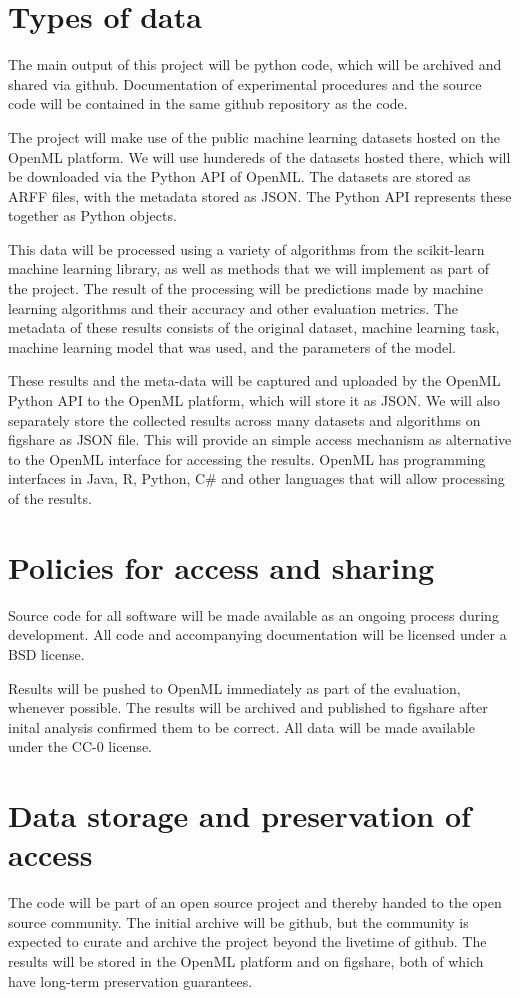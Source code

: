 \section{Types of data}

The main output of this project will be python code, which will be archived and
shared via github. Documentation of experimental procedures and the source code
will be contained in the same github repository as the code.

The project will make use of the public machine learning datasets hosted on the
OpenML platform. We will use hundereds of the datasets hosted there, which will
be downloaded via the Python API of OpenML\@. The datasets are stored as ARFF
files, with the metadata stored as JSON\@. The Python API represents these
together as Python objects.

This data will be processed using a variety of algorithms from the scikit-learn
machine learning library, as well as methods that we will implement as part of
the project. The result of the processing will be predictions made by machine
learning algorithms and their accuracy and other evaluation metrics. The
metadata of these results consists of the original dataset, machine learning
task, machine learning model that was used, and the parameters of the model.

These results and the meta-data will be captured and uploaded by the OpenML
Python API to the OpenML platform, which will store it as JSON\@. We will also
separately store the collected results across many datasets and algorithms on
figshare as JSON file. This will provide an  simple access mechanism as
alternative to the OpenML interface for accessing the results. OpenML has
programming interfaces in Java, R, Python, C\# and other languages that will
allow processing of the results.


\section{Policies for access and sharing}

Source code for all software will be made available as an ongoing process
during development. All code and accompanying documentation will be licensed
under a BSD license.

Results will be pushed to OpenML immediately as part of the evaluation,
whenever possible. The results will be archived and published to figshare after
inital analysis confirmed them to be correct.
All data will be made available under the CC-0 license.

\section{Data storage and preservation of access}

The code will be part of an open source project and thereby handed to the open
source community. The initial archive will be github, but the community is
expected to curate and archive the project beyond the livetime of github.
The results will be stored in the OpenML platform and on figshare, both of
which have long-term preservation guarantees.

